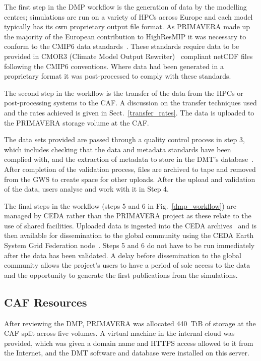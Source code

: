 \documentclass[gmd, manuscript]{copernicus}
\begin{document}
The first step in the DMP workflow is the generation of data by the modelling centres; simulations are run on a variety of HPCs across Europe and each model typically has its own proprietary output file format. As PRIMAVERA made up the majority of the European contribution to HighResMIP it was necessary to conform to the  CMIP6 data standards~\citep{gmd-11-3659-2018}. These standards require data to be provided in CMOR3 (Climate Model Output Rewriter)~\citep{Nadeau2019} compliant netCDF files following the CMIP6 conventions. Where data had been generated in a proprietary format it was post-processed to comply with these standards.

The second step in the workflow is the transfer of the data from the HPCs or post-processing systems to the CAF. A discussion on the transfer techniques used and the rates achieved is given in Sect.~\ref{transfer_rates}. The data is uploaded to the PRIMAVERA storage volume at the CAF.

The data sets provided are passed through a quality control process in step 3, which includes checking that the data and metadata standards have been complied with, and the extraction of metadata to store in the DMT's database~\citep{Seddon2020}. After completion of the validation process, files are archived to tape and removed from the GWS to create space for other uploads. After the upload and validation of the data, users analyse and work with it in Step 4. 

The final steps in the workflow (steps 5 and 6 in Fig.~\ref{dmp_workflow}) are managed by CEDA rather than the PRIMAVERA project as these relate to the use of shared facilities. Uploaded data is ingested into the CEDA archives~\citep{CEDAArchive} and is then available for dissemination to the global community using the CEDA Earth System Grid Federation node~\citep{CEDAESGF}. Steps 5 and 6 do not have to be run immediately after the data has been validated. A delay before dissemination to the global community allows the project's users to have a period of sole access to the data and the opportunity to generate the first publications from the simulations.


\subsection{CAF Resources}

After reviewing the DMP, PRIMAVERA was allocated 440~TiB of storage at the CAF split across five volumes. A virtual machine in the internal cloud was provided, which was given a domain name and HTTPS access allowed to it from the Internet, and the DMT software and database were installed on this server.
\end{document}
